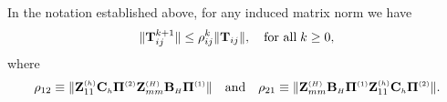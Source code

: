 \begin{lemma}\label{lem:2D:genbounds}
In the notation established above, for any induced matrix norm we have
%
\begin{equation}\label{eq:2D:powers}
\|\T_{ij}^{k+1}\| \leq \rho_{ij}^{k} \|\T_{ij}\|,\quad \text{for all}\;k\geq0,
\end{equation}
where
\begin{equation}\label{eq:2D:rho}
\rho_{12}\equiv  \|\Z_{11}^{\klein{(h)}}\matCh\PiTwo\Z_{mm}^{\klein{(H)}}\matBH\PiOne\|
\quad\mbox{and}\quad
\rho_{21} \equiv
\|\Z_{mm}^{\klein{(H)}}\matBH\PiOne\Z_{11}^{\klein{(h)}}\matCh\PiTwo\|.
\end{equation}
%
%
%
\end{lemma}

